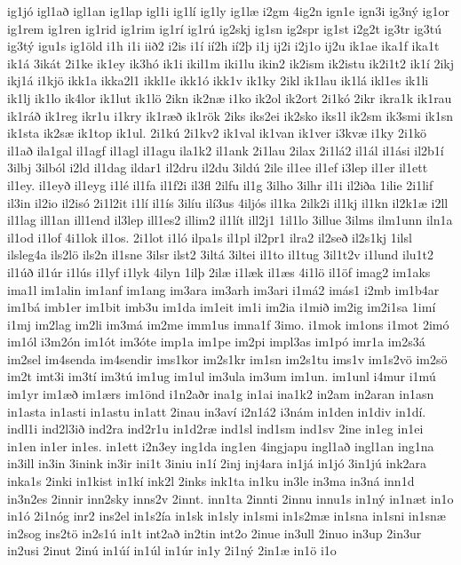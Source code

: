 {ig1jó
igl1að
igl1an
ig1lap
igl1i
ig1lí
ig1ly
ig1læ
i2gm
4ig2n
ign1e
ign3i
ig3ný
ig1or
ig1rem
ig1ren
ig1rid
ig1rim
ig1rí
ig1rú
ig2skj
ig1sn
ig2spr
ig1st
i2g2t
ig3tr
ig3tú
ig3tý
igu1s
ig1öld
i1h
i1i
iið2
i2is
i1í
ií2h
ií2þ
i1j
ij2i
i2j1o
ij2u
ik1ae
ika1f
ika1t
ik1á
3ikát
2i1ke
ik1ey
ik3hó
ik1i
ikil1m
iki1lu
ikin2
ik2ism
ik2istu
ik2i1t2
ik1í
2ikj
ikj1á
i1kjö
ikk1a
ikka2l1
ikkl1e
ikk1ó
ikk1v
ik1ky
2ikl
ik1lau
ik1lá
ikl1es
ik1li
ik1lj
ik1lo
ik4lor
ik1lut
ik1lö
2ikn
ik2næ
i1ko
ik2ol
ik2ort
2i1kó
2ikr
ikra1k
ik1rau
ik1ráð
ik1reg
ikr1u
i1kry
ik1ræð
ik1rök
2iks
iks2ei
ik2sko
iks1l
ik2sm
ik3smi
ik1sn
ik1sta
ik2sæ
ik1top
ik1ul.
2i1kú
2i1kv2
ik1val
ik1van
ik1ver
i3kvæ
i1ky
2i1kö
il1að
ila1gal
il1agf
il1agl
il1agu
ila1k2
il1ank
2i1lau
2ilax
2i1lá2
il1ál
il1ási
il2b1í
3ilbj
3ilból
i2ld
il1dag
ildar1
il2dru
il2du
3ildú
2ile
il1ee
il1ef
i3lep
il1er
il1ett
il1ey.
il1eyð
il1eyg
i1lé
il1fa
il1f2i
il3fl
2ilfu
il1g
3ilho
3ilhr
il1i
il2iða
1ilie
2i1lif
il3in
il2io
il2isó
2i1l2it
i1lí
il1ís
3ilíu
ilí3us
4iljós
il1ka
2ilk2i
il1kj
il1kn
il2k1æ
i2ll
il1lag
ill1an
ill1end
il3lep
ill1es2
illim2
il1lít
ill2j1
1il1lo
3illue
3ilms
ilm1unn
iln1a
il1od
i1lof
4i1lok
il1os.
2i1lot
i1ló
ilpa1s
il1pl
il2pr1
ilra2
il2seð
il2s1kj
1ilsl
ilsleg4a
ils2lö
ils2n
il1sne
3ilsr
ilst2
3iltá
3iltei
il1to
il1tug
3il1t2v
i1lund
ilu1t2
il1úð
il1úr
i1lús
i1lyf
i1lyk
4ilyn
1ilþ
2ilæ
i1læk
il1æs
4i1lö
il1öf
imag2
im1aks
ima1l
im1alin
im1anf
im1ang
im3ara
im3arh
im3ari
i1má2
imás1
i2mb
im1b4ar
im1bá
imb1er
im1bit
imb3u
im1da
im1eit
im1i
im2ia
i1mið
im2ig
im2i1sa
1imí
i1mj
im2lag
im2li
im3má
im2me
imm1us
imna1f
3imo.
i1mok
im1ons
i1mot
2imó
im1ól
i3m2ón
im1ót
im3óte
imp1a
im1pe
im2pi
impl3as
im1pó
imr1a
im2s3á
im2sel
im4senda
im4sendir
ims1kor
im2s1kr
im1sn
im2s1tu
ims1v
im1s2vö
im2sö
im2t
imt3i
im3tí
im3tú
im1ug
im1ul
im3ula
im3um
im1un.
im1unl
i4mur
i1mú
im1yr
im1æð
im1ærs
im1önd
i1n2aðr
ina1g
in1ai
ina1k2
in2am
in2aran
in1asn
in1asta
in1asti
in1astu
in1att
2inau
in3aví
i2n1á2
i3nám
in1den
in1div
in1dí.
indl1i
ind2l3ið
ind2ra
ind2r1u
in1d2ræ
ind1sl
ind1sm
ind1sv
2ine
in1eg
in1ei
in1en
in1er
in1es.
in1ett
i2n3ey
ing1da
ing1en
4ingjapu
ingl1að
ingl1an
ing1na
in3ill
in3in
3inink
in3ir
ini1t
3iniu
in1í
2inj
inj4ara
in1já
in1jó
3in1jú
ink2ara
inka1s
2inki
in1kist
in1kí
ink2l
2inks
ink1ta
in1ku
in3le
in3ma
in3ná
inn1d
in3n2es
2innir
inn2sky
inns2v
2innt.
inn1ta
2innti
2innu
innu1s
in1ný
in1næt
in1o
in1ó
2i1nóg
inr2
ins2el
in1s2ía
in1sk
in1sly
in1smi
in1s2mæ
in1sna
in1sni
in1snæ
in2sog
ins2tö
in2s1ú
in1t
int2að
in2tin
int2o
2inue
in3ull
2inuo
in3up
2in3ur
in2usi
2inut
2inú
in1úí
in1úl
in1úr
in1y
2i1ný
2in1æ
in1ö
i1o
}
